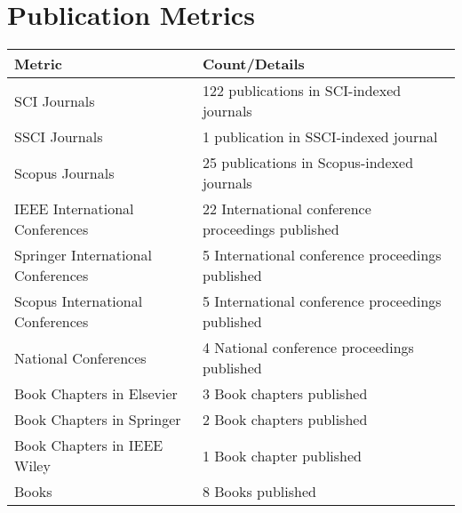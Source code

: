 \documentclass[11pt,a4paper]{moderncv}
\begin{document}
\vspace{1cm}

\section{\textbf{Publication Metrics}}

\begin{adjustwidth}{6em}{0pt}
\begin{center}
\begin{tabular}{p{7cm}p{9cm}}
	
	\hline
	\textbf{Metric} & \textbf{Count/Details} \\
	\hline
	SCI Journals& 122 publications in SCI-indexed journals \\
	SSCI Journals& 1 publication in SSCI-indexed journal \\
	Scopus Journals& 25 publications in Scopus-indexed journals \\
	IEEE International Conferences & 22 International conference proceedings published \\
	Springer International Conferences  & 5 International conference proceedings published \\
	Scopus International Conferences  & 5 International conference proceedings published \\
	National Conferences  & 4 National conference proceedings published \\
	Book Chapters in Elsevier & 3 Book chapters published \\
	Book Chapters in Springer & 2 Book chapters published \\
	Book Chapters in IEEE Wiley & 1 Book chapter published \\
	Books & 8 Books published \\
	\hline
\end{tabular}
\end{center}
\end{adjustwidth}
\end{document}
